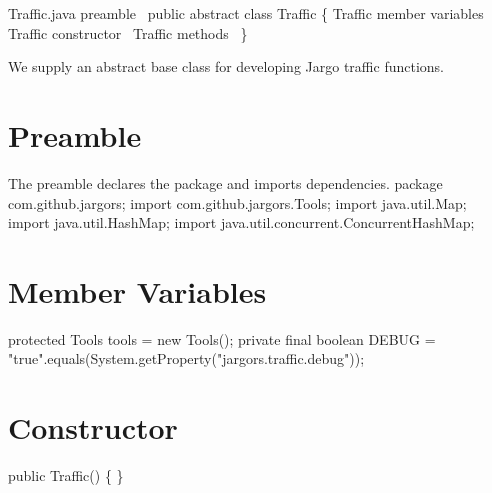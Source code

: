 \nwenddocs{}\endmoddef{}
\LA{}Traffic.java preamble~{\nwtagstyle{}}\RA{}
public abstract class Traffic \{
  \LA{}\code{}Traffic\edoc{} member variables~{\nwtagstyle{}}\RA{}
  \LA{}\code{}Traffic\edoc{} constructor~{\nwtagstyle{}}\RA{}
  \LA{}\code{}Traffic\edoc{} methods~{\nwtagstyle{}}\RA{}
\}
\nwendcode{}\nwdocspar

We supply an abstract base class for developing Jargo traffic functions.

\section{Preamble}
The preamble declares the package and imports dependencies.
\nwenddocs{}\endmoddef{}
package com.github.jargors;
import com.github.jargors.Tools;
import java.util.Map;
import java.util.HashMap;
import java.util.concurrent.ConcurrentHashMap;
\nwendcode{}\nwdocspar

\section{Member Variables}
\nwenddocs{}\endmoddef{}
protected Tools tools = new Tools();
private final boolean DEBUG = "true".equals(System.getProperty("jargors.traffic.debug"));
\nwendcode{}\nwdocspar


\section{Constructor}
\nwenddocs{}\endmoddef{}
public Traffic() \{ \}
\nwendcode{}\nwdocspar

